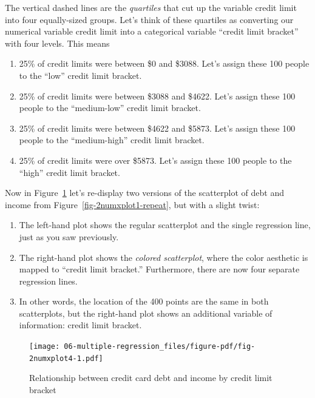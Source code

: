 \documentclass[
  letterpaper,
  DIV=11,
  numbers=noendperiod]{scrreprt}
\providecommand{\tightlist}{%
  \setlength{\itemsep}{0pt}\setlength{\parskip}{0pt}}\usepackage{longtable,booktabs,array}
\theoremstyle{definition}
\theoremstyle{remark}
\begin{document}
The vertical dashed lines are the \emph{quartiles} that cut up the
variable credit limit into four equally-sized groups. Let's think of
these quartiles as converting our numerical variable credit limit into a
categorical variable ``credit limit bracket'' with four levels. This
means

\begin{enumerate}
\def\labelenumi{\arabic{enumi}.}
\tightlist
\item
  25\% of credit limits were between \$0 and \$3088. Let's assign these
  100 people to the ``low'' credit limit bracket.
\item
  25\% of credit limits were between \$3088 and \$4622. Let's assign
  these 100 people to the ``medium-low'' credit limit bracket.
\item
  25\% of credit limits were between \$4622 and \$5873. Let's assign
  these 100 people to the ``medium-high'' credit limit bracket.
\item
  25\% of credit limits were over \$5873. Let's assign these 100 people
  to the ``high'' credit limit bracket.
\end{enumerate}

Now in Figure~\ref{fig-2numxplot4} let's re-display two versions of the
scatterplot of debt and income from Figure~\ref{fig-2numxplot1-repeat},
but with a slight twist:

\begin{enumerate}
\def\labelenumi{\arabic{enumi}.}
\tightlist
\item
  The left-hand plot shows the regular scatterplot and the single
  regression line, just as you saw previously.
\item
  The right-hand plot shows the \emph{colored scatterplot}, where the
  color aesthetic is mapped to ``credit limit bracket.'' Furthermore,
  there are now four separate regression lines.
\item
  In other words, the location of the 400 points are the same in both
  scatterplots, but the right-hand plot shows an additional variable of
  information: credit limit bracket.
\end{enumerate}

\begin{figure}

{\centering \texttt{[image: 06-multiple-regression\_files/figure-pdf/fig-2numxplot4-1.pdf]}

}

\caption{\label{fig-2numxplot4}Relationship between credit card debt and
income by credit limit bracket}

\end{figure}
\end{document}

